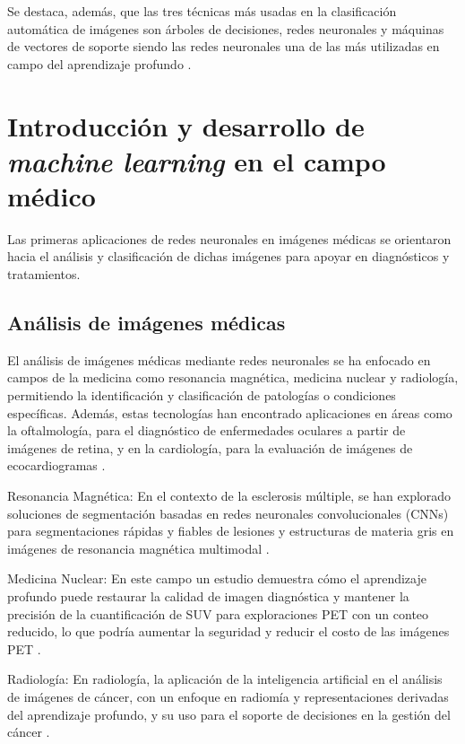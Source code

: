 Se destaca, además, que las tres técnicas más usadas en la clasificación automática de imágenes son árboles de decisiones, redes neuronales y máquinas de vectores de soporte siendo las redes neuronales una de las más utilizadas en campo del aprendizaje profundo . 

\section{Introducción y desarrollo de \textit{machine learning} en el campo médico}

Las primeras aplicaciones de redes neuronales en imágenes médicas se orientaron hacia el análisis y clasificación de dichas imágenes para apoyar 
en diagnósticos y tratamientos. 

\subsection{Análisis de imágenes médicas}

El análisis de imágenes médicas mediante redes neuronales se ha enfocado en campos de la medicina como resonancia magnética, medicina nuclear y radiología, permitiendo la identificación y clasificación de patologías o condiciones específicas. Además, estas tecnologías han encontrado aplicaciones en áreas como la oftalmología, para el diagnóstico de enfermedades oculares a partir de imágenes de retina, y en la cardiología, para la evaluación de imágenes de ecocardiogramas .

\begin{description}   
    \item Resonancia Magnética: En el contexto de la esclerosis múltiple, se han explorado soluciones de segmentación basadas en redes neuronales convolucionales (CNNs) para segmentaciones rápidas y fiables de lesiones y estructuras de materia gris en imágenes de resonancia magnética multimodal .
    
    \item Medicina Nuclear:  En este campo un estudio demuestra cómo el aprendizaje profundo puede restaurar la calidad de imagen diagnóstica y mantener la precisión de la cuantificación de SUV para exploraciones PET con un conteo reducido, lo que podría aumentar la seguridad y reducir el costo de las imágenes PET .
    
    \item Radiología: En radiología, la aplicación de la inteligencia artificial en el análisis de imágenes de cáncer, con un enfoque en radiomía y representaciones derivadas del aprendizaje profundo, y su uso para el soporte de decisiones en la gestión del cáncer .
\end{description}

